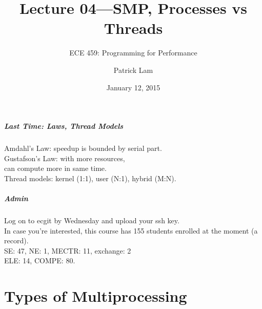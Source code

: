 \documentclass[aspectratio=43]{beamer}
\title{Lecture 04---SMP, Processes vs Threads}
\subtitle{ECE 459: Programming for Performance}
\author{Patrick Lam}
\institute{University of Waterloo}
\date{January 12, 2015}
\newenvironment{changemargin}[1]{%
  \begin{list}{}{%
    \setlength{\topsep}{0pt}%
    \setlength{\leftmargin}{#1}%
    \setlength{\rightmargin}{1em}
    \setlength{\listparindent}{\parindent}%
    \setlength{\itemindent}{\parindent}%
    \setlength{\parsep}{\parskip}%
  }%
  \item[]}{\end{list}}
\begin{document}
\begin{frame}[plain]
  \titlepage
\end{frame}

\begin{frame}
  \frametitle{Last Time: Laws, Thread Models}

  \begin{changemargin}{2cm}
    Amdahl's Law: speedup is bounded by serial part.\\[1em]

    Gustafson's Law: with more resources, \\
    \hspace*{2em}can compute more in same time.\\[2em]
    Thread models: kernel (1:1), user (N:1), hybrid (M:N).
  \end{changemargin}
\end{frame}

\begin{frame}
  \frametitle{Admin}
  \begin{changemargin}{2cm}
  Log on to ecgit by Wednesday and upload your ssh key.\\[2em]
  In case you're interested, this course has 155 students enrolled at the moment (a record).\\[1em]
  SE: 47, NE: 1, MECTR: 11, exchange: 2\\
  ELE: 14, COMPE: 80.
  \end{changemargin}

\end{frame}

\part{Types of Multiprocessing}
\begin{frame}
  \partpage
\end{frame}
\end{document}
